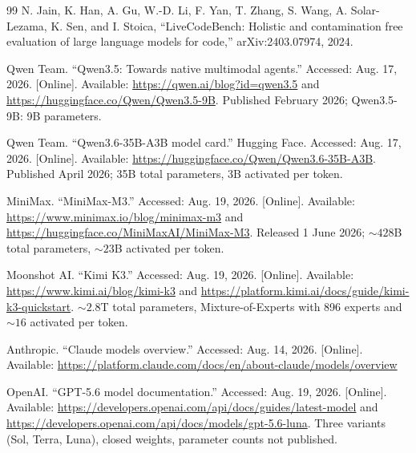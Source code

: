 \documentclass[11pt]{article}
\begin{document}
\begin{thebibliography}{99}
 N. Jain, K. Han, A. Gu, W.-D. Li, F. Yan, T. Zhang, S. Wang,
A. Solar-Lezama, K. Sen, and I. Stoica, ``LiveCodeBench: Holistic and contamination free
evaluation of large language models for code,'' arXiv:2403.07974, 2024.

 Qwen Team. ``Qwen3.5: Towards native multimodal agents.'' Accessed:
Aug. 17, 2026. [Online]. Available: \url{https://qwen.ai/blog?id=qwen3.5} and
\url{https://huggingface.co/Qwen/Qwen3.5-9B}. Published February 2026; Qwen3.5-9B: 9B
parameters.

 Qwen Team. ``Qwen3.6-35B-A3B model card.'' Hugging Face. Accessed:
Aug. 17, 2026. [Online]. Available:
\url{https://huggingface.co/Qwen/Qwen3.6-35B-A3B}. Published April 2026; 35B total
parameters, 3B activated per token.

 MiniMax. ``MiniMax-M3.'' Accessed: Aug. 19, 2026. [Online].
Available: \url{https://www.minimax.io/blog/minimax-m3} and
\url{https://huggingface.co/MiniMaxAI/MiniMax-M3}. Released 1 June 2026; ${\sim}428$B
total parameters, ${\sim}23$B activated per token.

 Moonshot AI. ``Kimi K3.'' Accessed: Aug. 19, 2026. [Online].
Available: \url{https://www.kimi.ai/blog/kimi-k3} and
\url{https://platform.kimi.ai/docs/guide/kimi-k3-quickstart}.
${\sim}2.8$T total parameters, Mixture-of-Experts with 896 experts and ${\sim}16$
activated per token.

 Anthropic. ``Claude models overview.'' Accessed: Aug. 14, 2026.
[Online]. Available:
\url{https://platform.claude.com/docs/en/about-claude/models/overview}

 OpenAI. ``GPT-5.6 model documentation.'' Accessed: Aug. 19, 2026.
[Online]. Available: \url{https://developers.openai.com/api/docs/guides/latest-model} and
\url{https://developers.openai.com/api/docs/models/gpt-5.6-luna}. Three variants
(Sol, Terra, Luna), closed weights, parameter counts not published.

\end{thebibliography}
\end{document}

